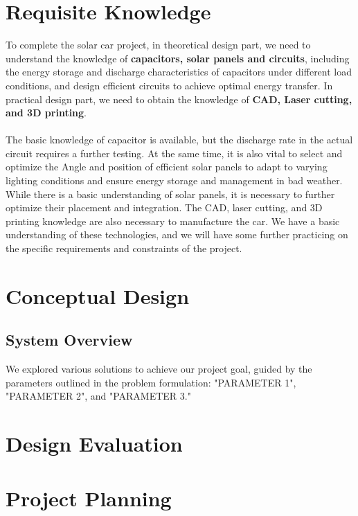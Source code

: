 \documentclass[12pt]{article}
\begin{document}
\section{Requisite Knowledge}
To complete the solar car project, in theoretical design part, we need to understand the knowledge of \textbf{capacitors, solar panels and circuits}, 
including the energy storage and discharge characteristics of capacitors under different load conditions, 
and design efficient circuits to achieve optimal energy transfer. In practical design part, we need to obtain the knowledge of \textbf{CAD, Laser cutting, and 3D printing}. 
\\
\\
The basic knowledge of capacitor is available, but the discharge rate in the actual circuit requires a further testing. 
At the same time, it is also vital to select and optimize the Angle and position of efficient solar panels to adapt 
to varying lighting conditions and ensure energy storage and management in bad weather. While there is a basic understanding of solar panels, 
it is necessary to further optimize their placement and integration. The CAD, laser cutting, and 3D printing knowledge are also necessary to manufacture the car.
We have a basic understanding of these technologies, and we will have some further practicing on the specific requirements and constraints of the project. 

\section{Conceptual Design}
\subsection{System Overview}
We explored various solutions to achieve our project goal, 
guided by the parameters outlined in the problem formulation: "PARAMETER 1", "PARAMETER 2", and "PARAMETER 3." 
\section{Design Evaluation}

\section{Project Planning}
\end{document}
